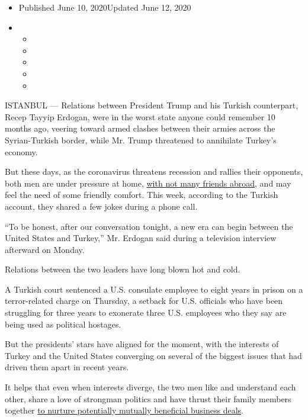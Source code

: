 \begin{itemize}
\item
  Published June 10, 2020Updated June 12, 2020
\item
  \begin{itemize}
  \item
  \item
  \item
  \item
  \item
  \end{itemize}
\end{itemize}

ISTANBUL --- Relations between President Trump and his Turkish
counterpart, Recep Tayyip Erdogan, were in the worst state anyone could
remember 10 months ago, veering toward armed clashes between their
armies across the Syrian-Turkish border, while Mr. Trump threatened to
annihilate Turkey's economy.

But these days, as the coronavirus threatens recession and rallies their
opponents, both men are under pressure at home,
\href{https://www.nytimes.com/2020/06/02/world/europe/trump-merkel-allies.html?searchResultPosition=1}{with
not many friends abroad}, and may feel the need of some friendly
comfort. This week, according to the Turkish account, they shared a few
jokes during a phone call.

``To be honest, after our conversation tonight, a new era can begin
between the United States and Turkey,'' Mr. Erdogan said during a
television interview afterward on Monday.

Relations between the two leaders have long blown hot and cold.

A Turkish court sentenced a U.S. consulate employee to eight years in
prison on a terror-related charge on Thursday, a setback for U.S.
officials who have been struggling for three years to exonerate three
U.S. employees who they say are being used as political hostages.

But the presidents' stars have aligned for the moment, with the
interests of Turkey and the United States converging on several of the
biggest issues that had driven them apart in recent years.

It helps that even when interests diverge, the two men like and
understand each other, share a love of strongman politics and have
thrust their family members together
\href{https://www.nytimes.com/2019/11/12/us/politics/trump-erdogan-family-turkey.html}{to
nurture potentially mutually beneficial business deals}.


